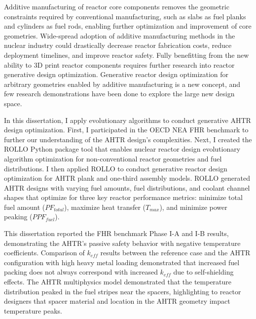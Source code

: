 
Additive manufacturing of reactor core components removes the geometric constraints
required by conventional manufacturing, such as slabs as fuel planks and cylinders 
as fuel rods, enabling further optimization and improvement of core geometries. 
Wide-spread adoption of additive manufacturing methods in the nuclear industry 
could drastically decrease reactor fabrication costs, reduce deployment timelines, 
and improve reactor safety. 
Fully benefitting from the new ability to 3D print reactor components requires further 
research into reactor generative design optimization. 
Generative reactor design optimization for arbitrary geometries enabled by additive 
manufacturing is a new concept, and few research demonstrations have been done to 
explore the large new design space. 

In this dissertation, I apply evolutionary algorithms to conduct generative \gls{AHTR} 
design optimization. 
First, I participated in the \gls{OECD} \gls{NEA} \gls{FHR} benchmark to further our 
understanding of the \gls{AHTR} design's complexities.  
Next, I created the \gls{ROLLO} Python package tool that enables nuclear reactor design 
evolutionary algorithm optimization for non-conventional reactor geometries and fuel 
distributions. 
I then applied \gls{ROLLO} to conduct generative reactor design optimization
for \gls{AHTR} plank and one-third assembly models.
\gls{ROLLO} generated \gls{AHTR} designs with varying fuel amounts, fuel 
distributions, and coolant channel shapes that optimize for three key reactor 
performance metrics: minimize total fuel amount ($PF_{total}$), maximize heat 
transfer ($T_{max}$), and minimize power peaking ($PPF_{fuel}$).

This dissertation reported the \gls{FHR} benchmark Phase I-A and I-B results, 
demonstrating the \gls{AHTR}'s passive safety behavior with 
negative temperature coefficients.
Comparison of $k_{eff}$ results between the reference case and the \gls{AHTR} 
configuration with high heavy metal loading demonstrated that increased fuel 
packing does not always correspond with increased $k_{eff}$ due to self-shielding 
effects.
The \gls{AHTR} multiphysics model demonstrated that the temperature distribution 
peaked in the fuel stripes near the spacers, highlighting to reactor designers that 
spacer material and location in the \gls{AHTR} geometry impact temperature peaks.  

